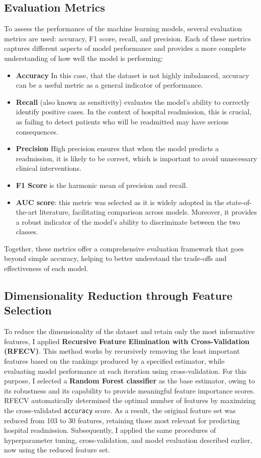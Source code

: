 \subsection{Evaluation Metrics}
To assess the performance of the machine learning models, several evaluation metrics are used: accuracy, F1 score, recall, and precision. Each of these metrics captures different aspects of model performance and provides a more complete understanding of how well the model is performing:
\begin{itemize}
    \item \textbf{Accuracy} In this case, that the dataset is not highly imbalanced, accuracy can be a useful metric as a general indicator of performance. 
    \item \textbf{Recall} (also known as sensitivity) evaluates the model’s ability to correctly identify positive cases. In the context of hospital readmission, this is crucial, as failing to detect patients who will be readmitted may have serious consequences.
    \item \textbf{Precision} High precision ensures that when the model predicts a readmission, it is likely to be correct, which is important to avoid unnecessary clinical interventions.
    \item \textbf{F1 Score} is the harmonic mean of precision and recall.
    \item \textbf{AUC score}: this metric was selected as it is widely adopted in the state-of-the-art literature, facilitating comparison across models. Moreover, it provides a robust indicator of the model’s ability to discriminate between the two classes.
\end{itemize}
\noindent
Together, these metrics offer a comprehensive evaluation framework that goes beyond simple accuracy, helping to better understand the trade-offs and effectiveness of each model.

\subsection{Dimensionality Reduction through Feature Selection}
To reduce the dimensionality of the dataset and retain only the most informative features, I applied \textbf{Recursive Feature Elimination with Cross-Validation (RFECV)}. This method works by recursively removing the least important features based on the rankings produced by a specified estimator, while evaluating model performance at each iteration using cross-validation.
For this purpose, I selected a \textbf{Random Forest classifier} as the base estimator, owing to its robustness and its capability to provide meaningful feature importance scores. RFECV automatically determined the optimal number of features by maximizing the cross-validated \texttt{accuracy} score.
As a result, the original feature set was reduced from 103 to 30 features, retaining those most relevant for predicting hospital readmission. Subsequently, I applied the same procedures of hyperparameter tuning, cross-validation, and model evaluation described earlier, now using the reduced feature set.

